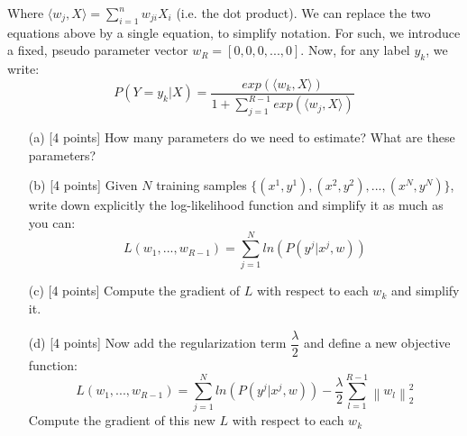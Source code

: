 \documentclass[12pt]{article}
\newcommand{\norm}[1]{\left\| #1\right\|}
\begin{document}
Where $\langle w_j, X \rangle = \sum_{i=1}^{n}w_{ji}X_i$ (i.e. the dot product).
We can replace the two equations above by a single equation, to simplify
notation. For such, we introduce a fixed, pseudo parameter vector $w_R =
[0,0,0,...,0]$. Now, for any label $y_k$, we write:
\begin{equation*}
P(Y = y_k | X) = \frac{exp(\langle w_{k}, X \rangle)}{1 + \sum_{j =
1}^{R-1}exp(\langle w_{j}, X \rangle)}
\end{equation*}
\begin{itemize}
\item[(a)][4 points] How many parameters do we need to estimate? What are these parameters?
\item[(b)][4 points] Given $N$ training samples $\{(x^1, y^1), (x^2, y^2), ..., (x^N,y^N)\}$,
write down explicitly the log-likelihood function and simplify it as much as you
can:
\begin{equation*}
L(w_1, ..., w_{R-1}) = \sum_{j = 1}^{N}ln(P(y^j| x^j,w))
\end{equation*}
\item[(c)][4 points] Compute the gradient of $L$ with respect to each $w_k$ and simplify
it.
\item[(d)][4 points] Now add the regularization term $\dfrac{\lambda}{2}$ and define a new
objective function:
\begin{equation*}
L(w_1, ..., w_{R-1}) = \sum_{j = 1}^{N}ln(P(y^j| x^j,w)) - \frac{\lambda}{2}\sum_{l=1}^{R-1}\norm{w_l}_2^2
\end{equation*}
Compute the gradient of this new $L$ with respect to each $w_k$
\end{itemize}
\end{document}
